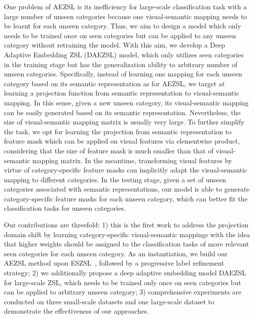 \documentclass[journal]{IEEEtran}
\begin{document}
One problem of AEZSL is its inefficiency for large-scale classification task with a large number of unseen categories because one visual-semantic mapping needs to be learnt for each unseen category. Thus, we aim to design a model which only needs to be trained once on seen categories but can be applied to any unseen category without retraining the model. With this aim, we develop a Deep Adaptive Embedding ZSL (DAEZSL) model, which only utilizes seen categories in the training stage but has the generalization ability to arbitrary number of unseen categories. Specifically, instead of learning one mapping for each unseen category based on its semantic representation as for AEZSL, we target at learning a projection function from semantic representation to visual-semantic mapping. In this sense, given a new unseen category, its visual-semantic mapping can be easily generated based on its semantic representation. Nevertheless, the size of visual-semantic mapping matrix is usually very large. To further simplify the task, we opt for learning the projection from semantic representation to feature mask which can be applied on visual features via elementwise product, considering that the size of feature mask is much smaller than that of visual-semantic mapping matrix. In the meantime, transforming visual features by virtue of category-specific feature masks can implicitly adapt the visual-semantic mapping to different categories. In the testing stage, given a set of unseen categories associated with semantic representations, our model is able to generate category-specific feature masks for each unseen category, which can better fit the classification tasks for unseen categories.

Our contributions are threefold: 1) this is the first work to address the projection domain shift by learning category-specific visual-semantic mappings with the idea that higher weights should be assigned to the classification tasks of more relevant seen categories for each unseen category. As an instantiation, we build our AEZSL method upon ESZSL~\cite{romera2015embarrassingly}, followed by a progressive label refinement strategy; 2) we additionally propose a deep adaptive embedding model DAEZSL for large-scale ZSL, which needs to be trained only once on seen categories but can be applied to arbitrary unseen category; 3) comprehensive experiments are conducted on three small-scale datasets and one large-scale dataset to demonstrate the effectiveness of our approaches.
\end{document}
